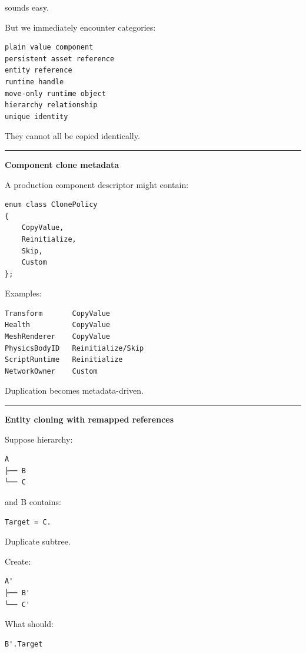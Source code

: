 sounds easy.

But we immediately encounter categories:

\begin{verbatim}
plain value component
persistent asset reference
entity reference
runtime handle
move-only runtime object
hierarchy relationship
unique identity
\end{verbatim}

They cannot all be copied identically.

\begin{center}\rule{0.5\linewidth}{0.5pt}\end{center}

\textbf{Component clone metadata}

A production component descriptor might contain:

\begin{verbatim}
enum class ClonePolicy
{
    CopyValue,
    Reinitialize,
    Skip,
    Custom
};
\end{verbatim}

Examples:

\begin{verbatim}
Transform       CopyValue
Health          CopyValue
MeshRenderer    CopyValue
PhysicsBodyID   Reinitialize/Skip
ScriptRuntime   Reinitialize
NetworkOwner    Custom
\end{verbatim}

Duplication becomes metadata-driven.

\begin{center}\rule{0.5\linewidth}{0.5pt}\end{center}

\textbf{Entity cloning with remapped references}

Suppose hierarchy:

\begin{verbatim}
A
├── B
└── C
\end{verbatim}

and B contains:

\begin{verbatim}
Target = C.
\end{verbatim}

Duplicate subtree.

Create:

\begin{verbatim}
A'
├── B'
└── C'
\end{verbatim}

What should:

\begin{verbatim}
B'.Target
\end{verbatim}

